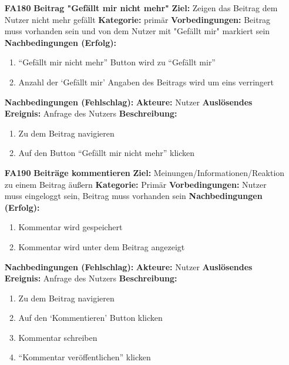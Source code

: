 \documentclass[parskip=full]{scrartcl}
\begin{document}
\begin{itemize}[nosep]
					
						\item[\textbf{FA180}]\textbf{Beitrag "Gefällt mir nicht mehr"}
						\newline \textbf{Ziel:} Zeigen das Beitrag dem Nutzer nicht mehr gefällt
						\newline \textbf{Kategorie:} primär
						\newline \textbf{Vorbedingungen:} Beitrag muss vorhanden sein und von dem Nutzer mit "Gefällt mir" markiert sein
						\newline \textbf{Nachbedingungen (Erfolg):} 
						\begin{enumerate}[nosep]
							\item “Gefällt mir nicht mehr” Button wird zu “Gefällt mir”
							\item Anzahl der ‘Gefällt mir’ Angaben des Beitrags wird um eins  verringert 
						\end{enumerate}
						\textbf{Nachbedingungen (Fehlschlag):}
						\newline \textbf{Akteure:} Nutzer
						\newline \textbf{Auslösendes Ereignis:} Anfrage des Nutzers
						\newline \textbf{Beschreibung:}
						\begin{enumerate}[nosep]
							\item Zu dem Beitrag navigieren
							\item Auf den Button “Gefällt mir nicht mehr” klicken\\
						\end{enumerate}
						
				
			\item[\textbf{FA190}]\textbf{Beiträge kommentieren}
				\newline \textbf{Ziel:} Meinungen/Informationen/Reaktion zu einem Beitrag äußern
				\newline \textbf{Kategorie:} Primär
				\newline \textbf{Vorbedingungen:} Nutzer muss eingeloggt sein, Beitrag muss vorhanden sein
				\newline \textbf{Nachbedingungen (Erfolg):} 
				\begin{enumerate}[nosep]
					\item Kommentar wird gespeichert
					\item Kommentar wird unter dem Beitrag angezeigt 
				\end{enumerate}
				\textbf{Nachbedingungen (Fehlschlag):}
				\newline \textbf{Akteure:} Nutzer
				\newline \textbf{Auslösendes Ereignis:} Anfrage des Nutzers
				\newline \textbf{Beschreibung:}
				\begin{enumerate}[nosep]
					\item Zu dem Beitrag navigieren
					\item Auf den ‘Kommentieren’ Button klicken
					\item Kommentar schreiben
					\item “Kommentar veröffentlichen” klicken\\
				\end{enumerate}
									

\end{itemize}
\end{document}
